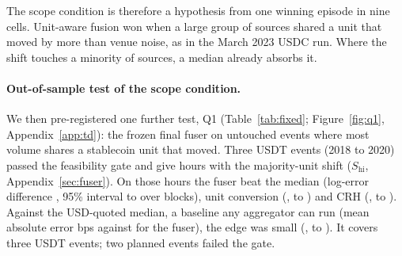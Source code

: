 \documentclass[sigconf,review,anonymous]{acmart}
\begin{document}
The scope condition is therefore a hypothesis from one winning episode in nine cells. Unit-aware fusion won when a large group of sources shared a unit that moved by more than venue noise, as in the
March 2023 USDC run. Where the shift touches a minority of sources, a median already absorbs it.

\paragraph{Out-of-sample test of the scope condition.} We then pre-registered one further test, Q1 (Table~\ref{tab:fixed}; Figure~\ref{fig:q1}, Appendix~\ref{app:td}): the frozen final fuser on untouched events where most volume shares a stablecoin
unit that moved. Three USDT events (2018 to 2020) passed the feasibility gate and
give \NumQSHiPooled{} hours with the majority-unit shift ($S_{\mathrm{hi}}$, Appendix~\ref{sec:fuser}). On those hours the fuser beat the median (log-error difference \NumQVsBZeroMean{}, 95\%
interval \NumQVsBZeroLo{} to \NumQVsBZeroHi{} over \NumQNBlocks{} blocks), unit conversion (\NumQVsBTwoMean{},
\NumQVsBTwoLo{} to \NumQVsBTwoHi{}) and CRH (\NumQVsBThreeMean{}, \NumQVsBThreeLo{} to \NumQVsBThreeHi{}).
Against the USD-quoted median, a baseline any aggregator can run (mean absolute error \NumQMaeOracle{} bps against \NumQMaeFuser{} for the fuser), the edge was small (\NumQVsUsdOnlyMean{}, \NumQVsUsdOnlyLo{} to \NumQVsUsdOnlyHi{}). It covers three USDT events; two planned events failed the gate.
\end{document}
